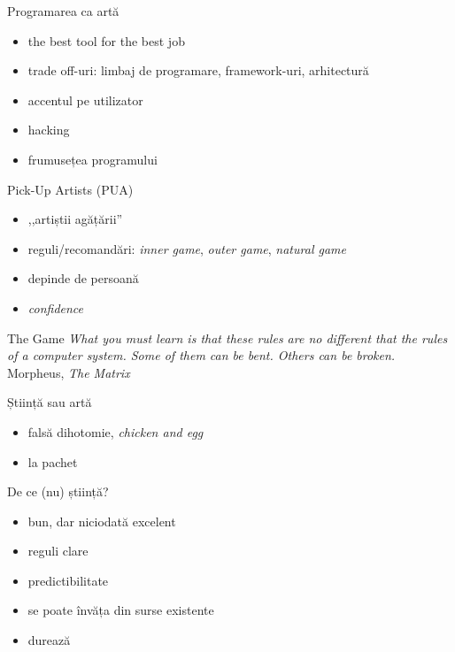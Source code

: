 \documentclass{simple}
\begin{document}
\begin{frame}{Programarea ca artă}
  \begin{itemize}
    \pause
    \item the best tool for the best job
    \item trade off-uri: limbaj de programare, framework-uri, arhitectură
    \item accentul pe utilizator
    \item hacking
    \item frumusețea programului
  \end{itemize}
\end{frame}

\begin{frame}{Pick-Up Artists (PUA)}
  \begin{itemize}
    \pause
    \item ,,artiștii agățării''
    \item reguli/recomandări: \textit{inner game}, \textit{outer game}, \textit{natural game}
    \item depinde de persoană
    \item \textit{confidence}
  \end{itemize}
\end{frame}

\begin{frame}{The Game}
  \textit{What you must learn is that these rules are no different that the rules of a computer system. Some of them can be bent. Others can be broken.}\\
  \vspace{0.5cm}
  \hfill{Morpheus, \textit{The Matrix}}
\end{frame}

\begin{frame}{Știință sau artă}
  \begin{itemize}
    \pause
    \item falsă dihotomie, \textit{chicken and egg}
    \item la pachet
  \end{itemize}
\end{frame}

\begin{frame}{De ce (nu) știință?}
  \begin{itemize}
    \pause
    \item bun, dar niciodată excelent
    \item reguli clare
    \item predictibilitate
    \item se poate învăța din surse existente
    \item durează
  \end{itemize}
\end{frame}
\end{document}
